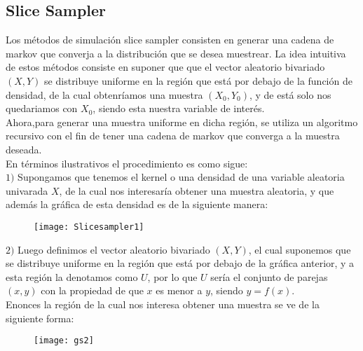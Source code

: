 \documentclass[11pt]{book}
\begin{document}
\subsection*{Slice Sampler}

Los métodos de simulación slice sampler consisten en generar una cadena de markov que converja a la distribución que se desea muestrear. La idea intuitiva de estos métodos consiste en suponer que que el vector aleatorio bivariado $(X,Y)$ se distribuye uniforme en la región que está por debajo de la función de densidad, de la cual obtenríamos una muestra $(X_{0},Y_{0})$, y de está solo nos quedariamos con $X_{0}$, siendo esta nuestra variable de interés.\\ 

Ahora,para generar una muestra uniforme en dicha región, se utiliza un algoritmo recursivo con el fin de tener una cadena de markov que converga a la muestra deseada.\\

En términos ilustrativos el procedimiento es como sigue:\\

$1)$ Supongamos que tenemos el kernel o una densidad de una variable aleatoria univarada $X$, de la cual nos interesaría obtener una muestra aleatoria, y que además la gráfica de esta densidad es de la siguiente manera:

\begin{figure}[h]
\centering
\texttt{[image: Slicesampler1]}
\caption{}
\label{Grafica}
\end{figure}

\bigskip
$2)$ Luego definimos el vector aleatorio bivariado $(X,Y)$, el cual suponemos que se distribuye uniforme en la región que está por debajo de la gráfica anterior, y a esta región la denotamos como $U$, por lo que $U$ sería el conjunto de parejas $(x,y)$ con la propiedad de que $x$ es menor a $y$, siendo $y=f(x)$.\\ Enonces la región de la cual nos interesa obtener una muestra se ve de la siguiente forma:

\begin{figure}[h]
\centering
\texttt{[image: gs2]}
\caption{}
\label{fig:gs2}
\end{figure}
\end{document}
